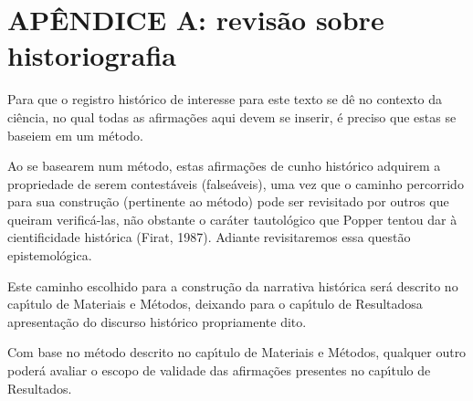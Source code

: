 \documentclass[
12pt,		%
openright,	%
twoside,  %
a4paper,			%
chapter=TITLE,		%
english,			%
french,				%
spanish,			%
brazil				%
]{USPSC-classe/USPSC}
\begin{document}
\chapter[AP\^ENDICE A: revis\~ao sobre historiografia]{AP\^ENDICE A: revis\~ao sobre historiografia}\label{AP\^ENDICE A: revis\~ao sobre historiografia}
Para que o registro hist\'orico de interesse para este texto se d\^e no contexto da ci\^encia, no qual todas as afirma\c{c}\~oes aqui devem se inserir, \'e preciso que estas se baseiem em um m\'etodo.

















Ao se basearem num m\'etodo, estas afirma\c{c}\~oes de cunho hist\'orico adquirem a propriedade de serem contest\'aveis (false\'aveis), uma vez que o caminho percorrido para sua constru\c{c}\~ao (pertinente ao m\'etodo) pode ser revisitado por outros que queiram verific\'a-las, n\~ao obstante o car\'ater tautol\'ogico que Popper tentou dar \`a cientificidade hist\'orica  (Firat, 1987). Adiante revisitaremos essa quest\~ao epistemol\'ogica.

















Este caminho escolhido para a constru\c{c}\~ao da narrativa hist\'orica ser\'a descrito no cap\'{\i}tulo de \textquotedbl Materiais e M\'etodos\textquotedbl , deixando para o cap\'{\i}tulo de \textquotedbl Resultados\textquotedbl  a apresenta\c{c}\~ao do discurso hist\'orico propriamente dito.

















Com base no m\'etodo descrito no cap\'{\i}tulo de \textquotedbl Materiais e M\'etodos\textquotedbl , qualquer outro poder\'a avaliar o escopo de validade das afirma\c{c}\~oes presentes no cap\'{\i}tulo de \textquotedbl Resultados\textquotedbl .
\end{document}
